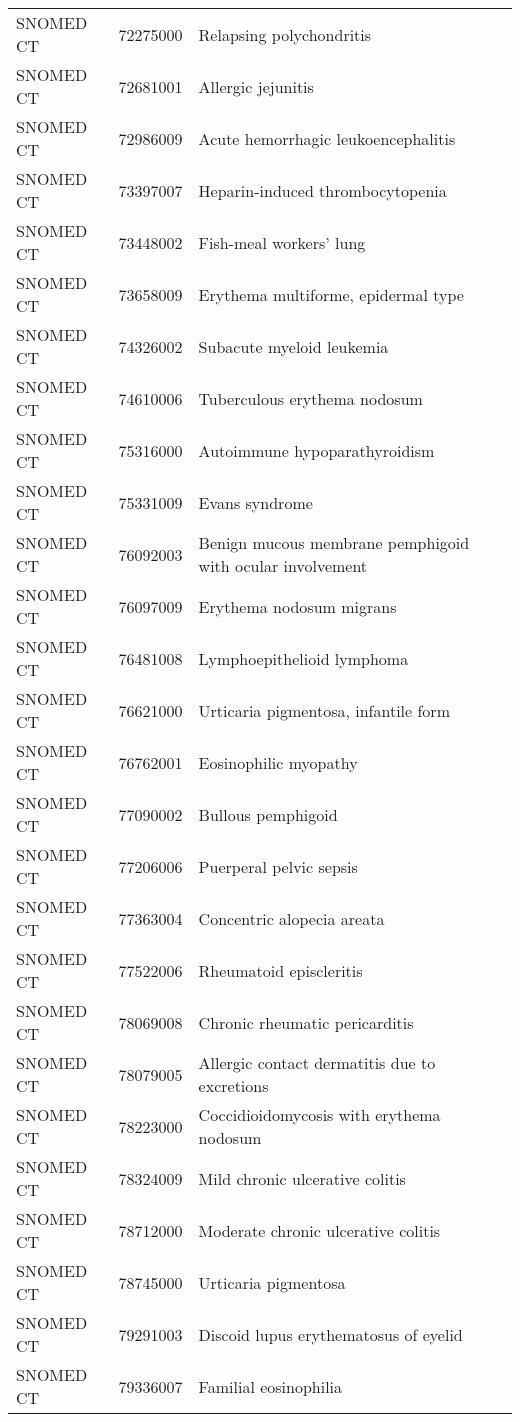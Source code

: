 \begin{longtable}{p{}p{}p{}}
  SNOMED CT & 72275000 & Relapsing polychondritis \\ 
  SNOMED CT & 72681001 & Allergic jejunitis \\ 
  SNOMED CT & 72986009 & Acute hemorrhagic leukoencephalitis \\ 
  SNOMED CT & 73397007 & Heparin-induced thrombocytopenia \\ 
  SNOMED CT & 73448002 & Fish-meal workers' lung \\ 
  SNOMED CT & 73658009 & Erythema multiforme, epidermal type \\ 
  SNOMED CT & 74326002 & Subacute myeloid leukemia \\ 
  SNOMED CT & 74610006 & Tuberculous erythema nodosum \\ 
  SNOMED CT & 75316000 & Autoimmune hypoparathyroidism \\ 
  SNOMED CT & 75331009 & Evans syndrome \\ 
  SNOMED CT & 76092003 & Benign mucous membrane pemphigoid with ocular involvement \\ 
  SNOMED CT & 76097009 & Erythema nodosum migrans \\ 
  SNOMED CT & 76481008 & Lymphoepithelioid lymphoma \\ 
  SNOMED CT & 76621000 & Urticaria pigmentosa, infantile form \\ 
  SNOMED CT & 76762001 & Eosinophilic myopathy \\ 
  SNOMED CT & 77090002 & Bullous pemphigoid \\ 
  SNOMED CT & 77206006 & Puerperal pelvic sepsis \\ 
  SNOMED CT & 77363004 & Concentric alopecia areata \\ 
  SNOMED CT & 77522006 & Rheumatoid episcleritis \\ 
  SNOMED CT & 78069008 & Chronic rheumatic pericarditis \\ 
  SNOMED CT & 78079005 & Allergic contact dermatitis due to excretions \\ 
  SNOMED CT & 78223000 & Coccidioidomycosis with erythema nodosum \\ 
  SNOMED CT & 78324009 & Mild chronic ulcerative colitis \\ 
  SNOMED CT & 78712000 & Moderate chronic ulcerative colitis \\ 
  SNOMED CT & 78745000 & Urticaria pigmentosa \\ 
  SNOMED CT & 79291003 & Discoid lupus erythematosus of eyelid \\ 
  SNOMED CT & 79336007 & Familial eosinophilia \\ 

\end{longtable}
